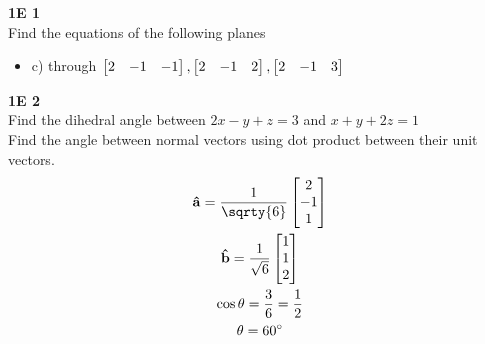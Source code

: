 \documentclass[11pt]{article}
\begin{document}
    \begin{problem}
        \textbf{1E 1}\\
        Find the equations of the following planes
        \begin{itemize}
            \item c) through $\bmqty{2 & -1 & -1}, \bmqty{2 & -1 & 2}, \bmqty{2 & -1 & 3}$\\
        \end{itemize}
    \end{problem}
    \begin{problem}
        \textbf{1E 2}\\
        Find the dihedral angle between $2x - y + z =3$ and $x + y + 2z = 1$\\
        Find the angle between normal vectors using dot product between their unit vectors.\\
        \begin{gather*}
            \vu{a}=\frac{1}{\sqrty{6}}\bmqty{2 \\ -1 \\ 1} \\
            \vu{b} = \frac{1}{\sqrt{6}}\bmqty{1 \\ 1 \\ 2}\\
            \cos{\theta}=\frac{3}{6}=\frac{1}{2}\\
            \theta=\ang{60}
        \end{gather*}
    \end{problem}
\end{document}
